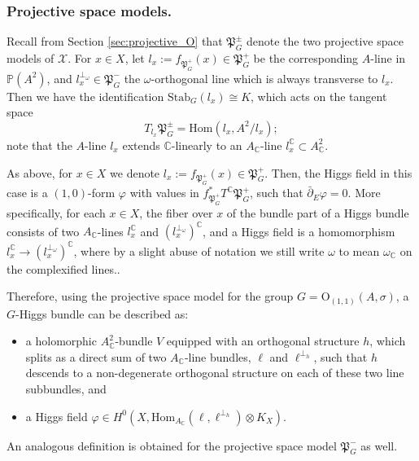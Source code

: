 \documentclass[oneside,11pt]{amsart}
\theoremstyle{definition}
\theoremstyle{remark}
\numberwithin{thm}{section}
\numberwithin{equation}{section}
\begin{document}
\subsubsection{Projective space models.}


Recall from Section \ref{sec:projective_O} that $\mathfrak{P}^{\pm}_G$ denote the two projective space models of $\mathcal{X}$. For $x\in X$, let $l_x:=f_{\mathfrak{P}^{+}_G}(x)\in\mathfrak{P}^+_G$ be the corresponding $A$-line in $\mathbb{P}(A^2)$, and $l_x^{\perp_\omega}\in \mathfrak{P}_G^-$ the $\omega$-orthogonal line which is always transverse to $l_x$. Then we have the identification $\mathrm{Stab}_G(l_x)\cong K$, which acts on the tangent space
$$
T_{l_x}\mathfrak{P}^{\pm}_G=\mathrm{Hom}(l_x,A^2/l_x);
$$
note that the $A$-line $l_x$ extends $\mathbb{C}$-linearly to an $A_{\mathbb C}$-line $l_{x}^{\mathbb{C}}\subset A_{\mathbb{C}}^2$. 

As above, for $x\in X$ we denote $l_x:=f_{\mathfrak{P}_G^+}(x)\in \mathfrak{P}_G^+$. Then, the Higgs field in this case is a $(1,0)$-form $\varphi$ with values in $f_{\mathfrak{P}_G^+}^*T^\mathbb{C}\mathfrak{P}_G^+$, such that $\bar\partial_E \varphi =0$. More specifically, for each $x\in X$, 
the fiber over $x$ of the bundle part of a Higgs bundle consists of two $A_\mathbb C$-lines $l_x^\mathbb C$ and $(l_x^{\perp_{\omega}})^\mathbb C$, and a Higgs field is a homomorphism $l_x^\mathbb C \to (l_x^{\perp_{\omega}})^\mathbb C$, where by a slight abuse of notation we still write $\omega$ to mean $\omega_{\mathbb{C}}$ on the complexified lines..

Therefore, using the projective space model for the group $G=\mathrm{O}_{(1,1)}(A,\sigma)$, a $G$-Higgs bundle can be described as: 
\begin{itemize}
    \item a holomorphic $A^2_{\mathbb{C}}$-bundle $V$ equipped with an orthogonal structure $h$, which splits as a direct sum of two $A_{\mathbb{C}}$-line bundles, $\ell$ and $\ell^{\perp_{h}}$, such that $h$ descends to a non-degenerate orthogonal structure on each of these two line subbundles, and
    \item a Higgs field $\varphi\in H^0(X,\mathrm{Hom}_{A_\mathbb C}(\ell, \ell^{\perp_{h}})\otimes K_X)$. 
\end{itemize}


An analogous definition is obtained for the projective space model $\mathfrak{P}_G^-$ as well.
\end{document}

